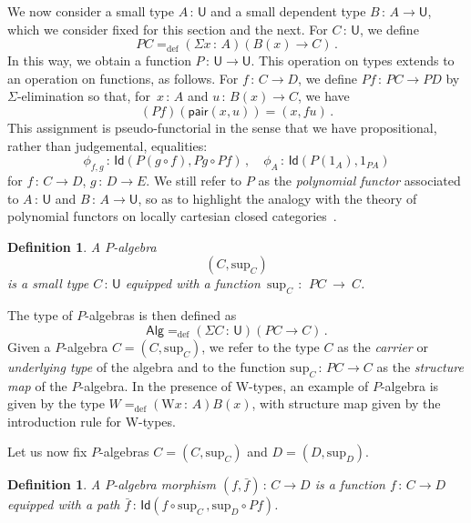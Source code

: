 \documentclass[10pt,a4paper,oneside,reqno]{amsart}
\numberwithin{equation}{section}
\theoremstyle{mythm}
\theoremstyle{mydef}
\newtheorem{definition}[theorem]{Definition}
\theoremstyle{myrmk}
\newcommand{\defeq}{=_{\mathrm{def}}}
\newcommand{\co}{\,{:}\,}
\newcommand{\Id}{\mathsf{Id}}
\newcommand{\pair}{\mathsf{pair}}
\newcommand{\W}{\mathrm{W}}
\newcommand{\U}{\mathsf{U}}
\newcommand{\Palg}{\mathsf{Alg}}
\renewcommand{\sup}{\mathrm{sup}}
\begin{document}
We now consider a small type $A \co \U$ and a small dependent type $B \co A \to \U$, which we consider
fixed for this section and the next. For $C \co \U$,
we define
\[
PC \defeq (\Sigma x \co A) (B(x) \to C) \, .
\]
In this way, we obtain a function $P \co \U \to \U$. This operation on types extends to an operation on functions, 
as follows. For $f \co C \to D$, we define $P f  \co PC \to PD$ by $\Sigma$-elimination
so that, for~$x \co A$ and $u \co B(x) \to C$, we have 
\[
(Pf )( \pair(x, u)) = (x, f u) \, .
\] 
This assignment is pseudo-functorial in the sense that we have propositional, rather than judgemental, equalities:
\begin{equation}
\label{equ:pseudofunP}
\phi_{f, g} \co \Id( P(g \circ f), Pg \circ Pf) \, , \quad \phi_A \co \Id( P(1_A), 1_{PA})
\end{equation}
for $f \co C \to D$, $g \co D \to E$. We still refer to $P$ as the \emph{polynomial functor} associated to $A \co \U$ 
and $B \co A \to \U$, so as to highlight the analogy with the theory of polynomial functors on locally cartesian closed categories~\cite{GambinoN:weltdp,MoerdijkI:weltc}.

\begin{definition} A \emph{$P$-algebra} 
\[
(C, \sup_C)
\] 
is a small type $C \co \U$ equipped with a function~$\sup_C~\co~PC~\to~C$. 
\end{definition}

\smallskip

 The type of $P$-algebras is then defined as 
 \[
 \Palg  \defeq (\Sigma C \co \U) (PC \to C) \, .
 \]
 Given a $P$-algebra $C = (C, \sup_C)$,
 we refer to the type $C$ as the \emph{carrier} or \emph{underlying type} of the algebra and to the function $\sup_C \co PC\to C$ as the \emph{structure map} of the $P$-algebra. 
  In the
 presence of W-types, an example of $P$-algebra is given by the type $W \defeq (\W x\co A)B(x)$, with structure map given by the introduction rule for W-types. 
 
 \medskip
 
Let us now fix $P$-algebras $C = (C, \sup_C)$ and $D = (D, \sup_D)$. 

\begin{definition} A \emph{$P$-algebra morphism} $(f, \bar{f}) \co C \to D$ 
is a function $f \co C \rightarrow D$ equipped with a path $\bar{f} \co \Id( f \circ \sup_C \, , \sup_{D} \circ P f)$.
\end{definition}
\end{document}
